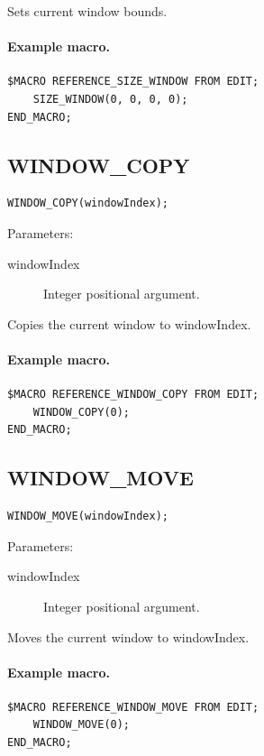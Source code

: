 \documentclass[a4paper,10pt,twoside,openany]{book}
\begin{document}
Sets current window bounds.

\paragraph{Example macro.}
\begin{verbatim}
$MACRO REFERENCE_SIZE_WINDOW FROM EDIT;
    SIZE_WINDOW(0, 0, 0, 0);
END_MACRO;
\end{verbatim}

\label{prim:procedure-window-copy}
\subsection*{WINDOW\_COPY}
\begin{verbatim}
WINDOW_COPY(windowIndex);
\end{verbatim}
Parameters:
\begin{description}
\item[windowIndex] Integer positional argument.
\end{description}

Copies the current window to windowIndex.

\paragraph{Example macro.}
\begin{verbatim}
$MACRO REFERENCE_WINDOW_COPY FROM EDIT;
    WINDOW_COPY(0);
END_MACRO;
\end{verbatim}

\label{prim:procedure-window-move}
\subsection*{WINDOW\_MOVE}
\begin{verbatim}
WINDOW_MOVE(windowIndex);
\end{verbatim}
Parameters:
\begin{description}
\item[windowIndex] Integer positional argument.
\end{description}

Moves the current window to windowIndex.

\paragraph{Example macro.}
\begin{verbatim}
$MACRO REFERENCE_WINDOW_MOVE FROM EDIT;
    WINDOW_MOVE(0);
END_MACRO;
\end{verbatim}
\end{document}

